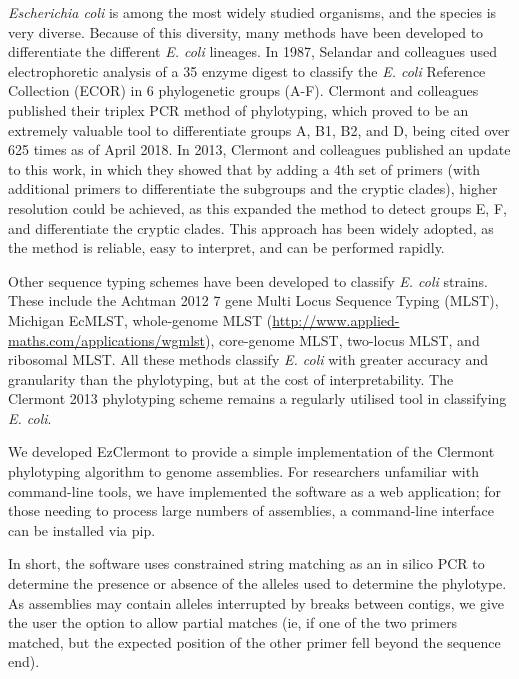 \textit{Escherichia coli} is among the most widely studied organisms, and the species is very diverse\cite{Lukjancenko2010, Selander1987}.  Because of this diversity, many methods have been developed to differentiate the different  \textit{E. coli} lineages.  In 1987, Selandar  and colleagues used electrophoretic analysis of a 35 enzyme digest to classify the \textit{E. coli} Reference Collection (ECOR) in 6 phylogenetic groups (A-F)\cite{Selander1987}.  Clermont and colleagues published their triplex PCR method of phylotyping, which proved to be an extremely valuable tool to differentiate groups A, B1, B2, and D, being cited over 625 times as of April 2018.  In 2013, Clermont and colleagues published an update to this work, in which they showed that by adding a 4th set of primers (with additional primers to differentiate the subgroups and the cryptic clades), higher resolution could be achieved, as this expanded the method to detect groups E, F, and differentiate the cryptic clades.  This approach has been widely adopted, as the method is reliable, easy to interpret, and can be performed rapidly.

Other sequence typing schemes have been developed to classify \textit{E. coli} strains. These include the Achtman 2012 7 gene Multi Locus Sequence Typing (MLST)\cite{Achtman2012}, Michigan EcMLST\cite{Qi2004}, whole-genome MLST (\url{http://www.applied-maths.com/applications/wgmlst}), core-genome MLST\cite{DeBeen2015},  two-locus MLST\cite{Weissman2012}, and ribosomal MLST\cite{Jolley2012}.  All these methods classify \textit{E. coli} with greater accuracy and granularity than the phylotyping, but at the cost of interpretability.  The Clermont 2013 phylotyping scheme remains a regularly utilised tool in classifying \textit{E. coli}.

We developed EzClermont to provide a simple implementation of the Clermont phylotyping algorithm to genome assemblies.  For researchers unfamiliar with command-line tools, we have implemented the software as a web application; for those needing to process large numbers of assemblies, a command-line interface can be installed via pip.

In short, the software uses constrained string matching as an in silico PCR to determine the presence or absence of the alleles used to determine the phylotype. As assemblies may contain alleles interrupted by breaks between contigs, we give the user the option to allow partial matches (ie, if one of the two primers matched, but the expected position of the other primer fell beyond the sequence end).


